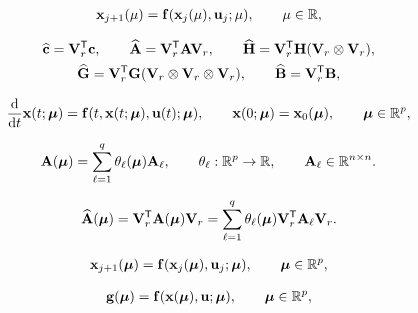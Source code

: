 \documentclass[12 pt]{article}
\begin{document}
\begin{align*}
    \xfom_{j+1}(\sparam)
    = \ffom(\xfom_{j}(\sparam),\ufom_{j};\sparam),
    \qquad
    \sparam\in\RR,
\end{align*}

\begin{gather*}
    \crom = \Vr\trp\cfom,
    \qquad
    \Arom = \Vr\trp\Afom\Vr,
    \qquad
    \Hrom = \Vr\trp\Hfom(\Vr \otimes \Vr),
    \\
    \Grom = \Vr\trp\Gfom(\Vr \otimes \Vr \otimes \Vr),
    \qquad
    \Brom = \Vr\trp\Bfom,
\end{gather*}

\begin{align*}
    \ddt\xfom(t;\vparam)
    = \ffom(t,\xfom(t;\vparam),\ufom(t);\vparam),
    \qquad
    \xfom(0;\vparam)
    = \xfom_0(\vparam),
    \qquad
    \vparam\in\RR^{p},
\end{align*}

\begin{align*}
    \Afom(\vparam)
    = \sum_{\ell=1}^{q} \theta_{\ell}(\vparam)\Afom_{\ell},
    \qquad
    \theta_{\ell}:\RR^{p}\to\RR,
    \qquad
    \Afom_{\ell}\in\RR^{n \times n}.
\end{align*}

\begin{align*}
    \Arom(\vparam)
    = \Vr\trp\Afom(\vparam)\Vr
    = \sum_{\ell=1}^{q}\theta_{\ell}(\vparam)\Vr\trp\Afom_{\ell}\Vr.
\end{align*}

\begin{align*}
    \xfom_{j+1}(\vparam)
    = \ffom(\xfom_{j}(\vparam),\ufom_{j};\vparam),
    \qquad
    \vparam\in\RR^{p},
\end{align*}

\begin{align*}
    \gfom(\vparam)
    = \ffom(\xfom(\vparam),\ufom;\vparam),
    \qquad
    \vparam\in\RR^{p},
\end{align*}
\end{document}
